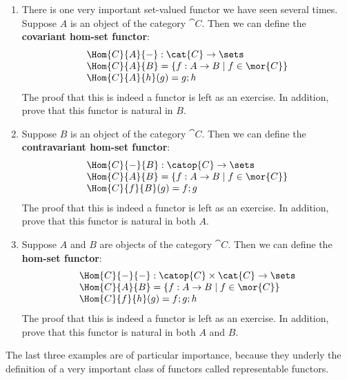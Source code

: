 \begin{enumerate}
\item There is one very important set-valued functor we have seen
  several times.  Suppose $A$ is an object of the category $\cat{C}$.
  Then we can define the \textbf{covariant hom-set functor}:
  \[
  \begin{array}{lll}
    \Hom{C}{A}{-} : \cat{C} \to \sets\\
    \Hom{C}{A}{B} = \{f : A \to B \mid f \in \mor{C}\}\\
    \Hom{C}{A}{h}(g) = g;h
  \end{array}
  \] 
  The proof that this is indeed a functor is left as an exercise. In
  addition, prove that this functor is natural in $B$.

\item Suppose $B$ is an object of the category $\cat{C}$.  Then we can
  define the \textbf{contravariant hom-set functor}:
  \[
  \begin{array}{lll}
    \Hom{C}{-}{B} : \catop{C} \to \sets\\
    \Hom{C}{A}{B} = \{f : A \to B \mid f \in \mor{C}\}\\
    \Hom{C}{f}{B}(g) = f;g
  \end{array}
  \] 
  The proof that this is indeed a functor is left as an exercise. In
  addition, prove that this functor is natural in both $A$.

\item Suppose $A$ and $B$ are objects of the category $\cat{C}$.  Then
  we can define the \textbf{hom-set functor}:
  \[
  \begin{array}{lll}
    \Hom{C}{-}{-} : \catop{C} \times \cat{C} \to \sets\\
    \Hom{C}{A}{B} = \{f : A \to B \mid f \in \mor{C}\}\\
    \Hom{C}{f}{h}(g) = f;g;h
  \end{array}
  \] 
  The proof that this is indeed a functor is left as an exercise. In
  addition, prove that this functor is natural in both $A$ and $B$.
\end{enumerate}
The last three examples are of particular importance, because they
underly the definition of a very important class of functors called
representable functors.
